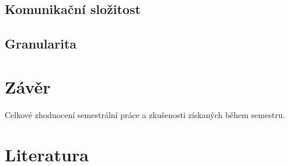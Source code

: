 \documentclass[11pt]{article}
\begin{document}
\subsection{Komunikační složitost}

\subsection{Granularita}


\section{Závěr}

Celkové zhodnocení semestrální práce a zkušenosti získaných během
semestru.

\section{Literatura}

\appendix
\end{document}
